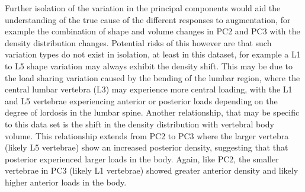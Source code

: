 Further isolation of the variation in the principal components would aid the
understanding of the true cause of the different responses to augmentation, for
example the combination of shape and volume changes in PC2 and PC3 with the
density distribution changes. Potential risks of this however are that such
variation types do not exist in isolation, at least in this dataset, for
example a L1 to L5 shape variation may always exhibit the density shift.  This
may be due to the load sharing variation caused by the bending of the lumbar
region, where the central lumbar vertebra (L3) may experience more central
loading, with the L1 and L5 vertebrae experiencing anterior or posterior loads
depending on the degree of lordosis in the lumbar spine.  Another relationship,
that may be specific to this data set is the shift in the density distribution
with vertebral body volume.  This relationship extends from PC2 to PC3 where
the larger vertebra (likely L5 vertebrae) show an increased posterior density,
suggesting that that posterior experienced larger loads in the body.  Again,
like PC2, the smaller vertebrae in PC3 (likely L1 vertebrae) showed greater
anterior density and likely higher anterior loads in the body.
